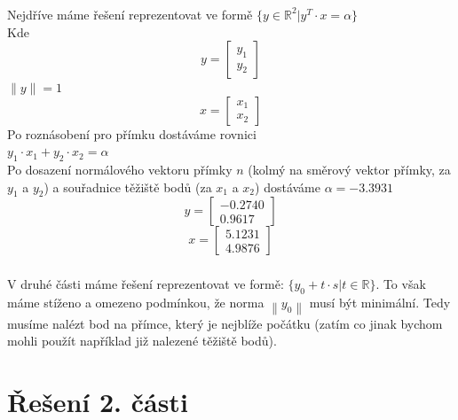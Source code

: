 \documentclass[10pt,a4paper,openright]{article}
\newcommand{\norm}[1]{\left\lVert#1\right\rVert}
\begin{document}
\subsubsection{}
\begin{center}
    Nejdříve máme řešení reprezentovat ve formě 
    $\{ y \in \mathbb{R} ^ 2 | y ^ T \cdot x = \alpha \}$\\
    Kde
    \[y =
    \begin{bmatrix}
        y_1\\
        y_2
    \end{bmatrix}\]
    $\| y \| = 1$
    \[x =
    \begin{bmatrix}
        x_1\\
        x_2
    \end{bmatrix}\]
    Po roznásobení pro přímku dostáváme rovnici\\
    $y_1 \cdot x_1 + y_2 \cdot x_2 = \alpha$\\
    Po dosazení normálového vektoru přímky $n$ (kolmý na směrový vektor přímky, za $y_1$ a $y_2$)
    a souřadnice těžiště bodů (za $x_1$ a $x_2$)
    dostáváme $\alpha = -3.3931$\\
    \[y =
    \begin{bmatrix}
        -0.2740\\
        0.9617
    \end{bmatrix}\]
    \[x =
    \begin{bmatrix}
        5.1231\\
        4.9876
    \end{bmatrix}\]
\end{center}
\subsubsection{}
\begin{center}
    V druhé části máme řešení reprezentovat ve formě: $\{y_0 + t \cdot s | t \in \mathbb{R} \}$.
    To však máme stíženo a omezeno podmínkou, že norma $\norm{y_0}$ musí být minimální. Tedy
    musíme nalézt bod na přímce, který je nejblíže počátku (zatím co jinak bychom mohli použít například
    již nalezené těžiště bodů).
\end{center}

\section{Řešení 2. části}
\end{document}
